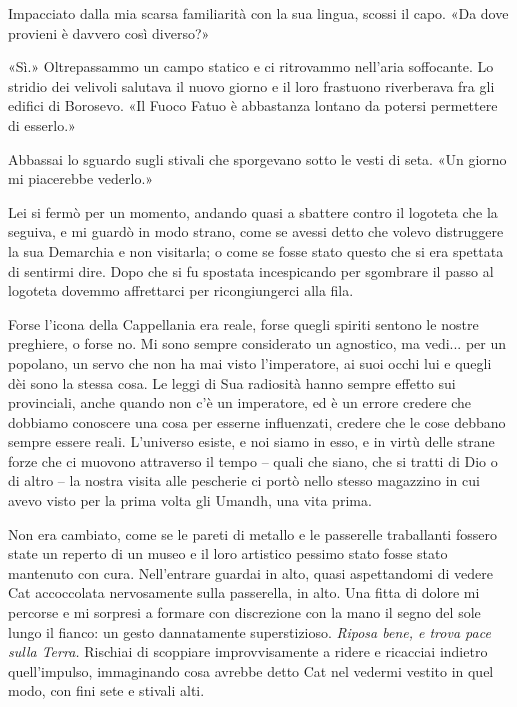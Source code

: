 Impacciato dalla mia scarsa familiarità con la sua lingua, scossi il
capo. «Da dove provieni è davvero così diverso?»

«Sì.» Oltrepassammo un campo statico e ci ritrovammo nell'aria
soffocante. Lo stridio dei velivoli salutava il nuovo giorno e il loro
frastuono riverberava fra gli edifici di Borosevo. «Il Fuoco Fatuo è
abbastanza lontano da potersi permettere di esserlo.»

Abbassai lo sguardo sugli stivali che sporgevano sotto le vesti di seta.
«Un giorno mi piacerebbe vederlo.»

Lei si fermò per un momento, andando quasi a sbattere contro il logoteta
che la seguiva, e mi guardò in modo strano, come se avessi detto che
volevo distruggere la sua Demarchia e non visitarla; o come se fosse
stato questo che si era spettata di sentirmi dire. Dopo che si fu
spostata incespicando per sgombrare il passo al logoteta dovemmo
affrettarci per ricongiungerci alla fila.

\begin{figure}
	\centering
	\def\svgwidth{\columnwidth}
	\scalebox{0.2}{}
\end{figure}

Forse l'icona della Cappellania era reale, forse quegli spiriti sentono
le nostre preghiere, o forse no. Mi sono sempre considerato un
agnostico, ma vedi... per un popolano, un servo che non ha mai visto
l'imperatore, ai suoi occhi lui e quegli dèi sono la stessa cosa. Le
leggi di Sua radiosità hanno sempre effetto sui provinciali, anche
quando non c'è un imperatore, ed è un errore credere che dobbiamo
conoscere una cosa per esserne influenzati, credere che le cose debbano
sempre essere reali. L'universo esiste, e noi siamo in esso, e in virtù
delle strane forze che ci muovono attraverso il tempo -- quali che
siano, che si tratti di Dio o di altro -- la nostra visita alle
pescherie ci portò nello stesso magazzino in cui avevo visto per la
prima volta gli Umandh, una vita prima.

Non era cambiato, come se le pareti di metallo e le passerelle
traballanti fossero state un reperto di un museo e il loro artistico
pessimo stato fosse stato mantenuto con cura. Nell'entrare guardai in
alto, quasi aspettandomi di vedere Cat accoccolata nervosamente sulla
passerella, in alto. Una fitta di dolore mi percorse e mi sorpresi a
formare con discrezione con la mano il segno del sole lungo il fianco:
un gesto dannatamente superstizioso. \emph{Riposa bene, e trova pace
	sulla Terra.} Rischiai di scoppiare improvvisamente a ridere e ricacciai
indietro quell'impulso, immaginando cosa avrebbe detto Cat nel vedermi
vestito in quel modo, con fini sete e stivali alti.

